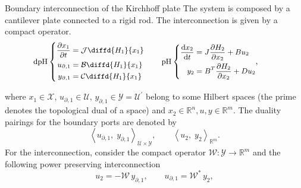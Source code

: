 \documentclass[aspectratio=169]{ISAE-Beamer}
\begin{document}
\begin{frame}{Boundary interconnection of the Kirchhoff plate}
The system is composed by a cantilever plate connected to a rigid rod. The interconnection is given by a compact operator.
\begin{equation*}
\small \text{dpH} \left\{ 
\begin{aligned}
\diffp{x_1}{t} &= \mathcal{J} \diffd{H_1}{x_1} \\
u_{\partial, 1}  &= \mathcal{B} \diffd{H_1}{x_1} \\
y_{\partial, 1} &= \mathcal{C} \diffd{H_1}{x_1} 
\end{aligned}
\right. \qquad
\text{pH} \left\{ 
\begin{aligned}
\diff{{x}_2}{t} &= {J} \diffp{H_2}{{x}_2} + {B} {u}_2 \\
{y}_{2} &= {B}^T \diffp{H_2}{{x}_2} + {D} {u}_2 \\
\end{aligned}, \qquad 
\right. 
\end{equation*} %

where $x_1 \in \mathscr{X}$,  $u_{\partial, 1}  \in \mathscr{U}, \, y_{\partial, 1} \in  \mathscr{Y} = \mathscr{U}^\prime$ belong to some Hilbert spaces (the prime denotes the topological dual of a space) and ${x}_2 \in \mathbb{R}^n, {u}, {y} \in \mathbb{R}^m$. The duality pairings for the boundary ports are denoted by
\[
\left\langle u_{\partial, 1}, \; y_{\partial, 1} \right\rangle_{\mathscr{U} \times \mathscr{Y}},  \qquad
\left\langle {u}_{2}, \; {y}_{2} \right\rangle_{\mathbb{R}^m}.
\]
For the interconnection, consider the compact operator $\mathcal{W}: \mathscr{Y} \rightarrow \mathbb{R}^m$ and the following power preserving interconnection
\begin{equation*}
\label{eq:int_inf}
{u}_2 = -\mathcal{W} \, y_{\partial, 1},  \qquad u_{\partial, 1} = \mathcal{W}^* \, {y}_2,
\end{equation*}
\end{frame}
\end{document}
